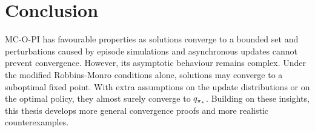     



\vspace{-0.2cm}


\section{Conclusion}

MC-O-PI has favourable properties as solutions converge to a bounded set and perturbations caused by episode simulations and asynchronous updates cannot prevent convergence.
However, its asymptotic behaviour remains complex. Under the modified Robbins-Monro conditions alone, solutions may converge to a suboptimal fixed point. With extra assumptions on the update distributions or on the optimal policy, they almost surely converge to $q_{{\pi}_*}$.
Building on these insights, this thesis develops more general convergence proofs and more realistic counterexamples.





\clearpage